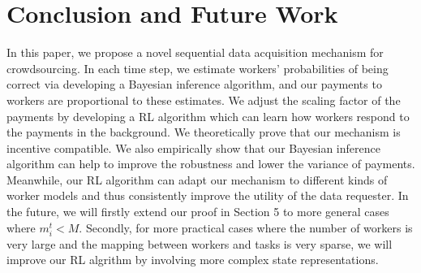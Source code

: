 \documentclass{article}
\theoremstyle{lemmas}
\begin{document}








\section{Conclusion and Future Work}
In this paper, we propose a novel sequential data acquisition mechanism for crowdsourcing.
In each time step, we estimate workers' probabilities of being correct via developing a Bayesian inference algorithm, and our payments to workers are proportional to these estimates.
We adjust the scaling factor of the payments by developing a RL algorithm which can learn how workers respond to the payments in the background.
We theoretically prove that our mechanism is incentive compatible.
We also empirically show that our Bayesian inference algorithm can help to improve the robustness and lower the variance of payments.
Meanwhile, our RL algorithm can adapt our mechanism to different kinds of worker models and thus consistently improve the utility of the data requester.
In the future, we will firstly extend our proof in Section 5 to more general cases where $m_i^t<M$.
Secondly, for more practical cases where the number of workers is very large and the mapping between workers and tasks is very sparse, we will improve our RL algrithm by involving more complex state representations.



\end{document}
